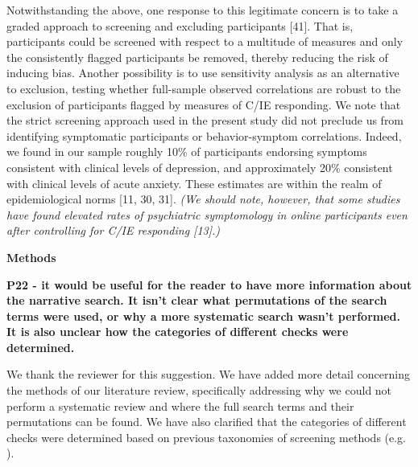 \documentclass[a4paper,notitlepage,12pt]{article}
\begin{document}
\begin{displayquote}
Notwithstanding the above, one response to this legitimate concern is to take a graded approach to screening and excluding participants [41]. That is, participants could be screened with respect to a multitude of measures and only the consistently flagged participants be removed, thereby reducing the risk of inducing bias. Another possibility is to use sensitivity analysis as an alternative to exclusion, testing whether full-sample observed correlations are robust to the exclusion of participants flagged by measures of C/IE responding. We note that the strict screening approach used in the present study did not preclude us from identifying symptomatic participants or behavior-symptom correlations. Indeed, we found in our sample roughly 10\% of participants endorsing symptoms consistent with clinical levels of depression, and approximately 20\% consistent with clinical levels of acute anxiety. These estimates are within the realm of epidemiological norms [11, 30, 31]. \textit{(We should note, however, that some studies have found elevated rates of psychiatric symptomology in online participants even after controlling for C/IE responding [13].)}
\end{displayquote}

\textbf{Methods}

\textbf{P22 - it would be useful for the reader to have more information about the narrative search. It isn't clear what permutations of the search terms were used, or why a more systematic search wasn't performed. It is also unclear how the categories of different checks were determined.}

We thank the reviewer for this suggestion. We have added more detail concerning the methods of our literature review, specifically addressing why we could not perform a systematic review and where the full search terms and their permutations can be found. We have also clarified that the categories of different checks were determined based on previous taxonomies of screening methods (e.g. \cite{curran2016methods}).
\end{document}
